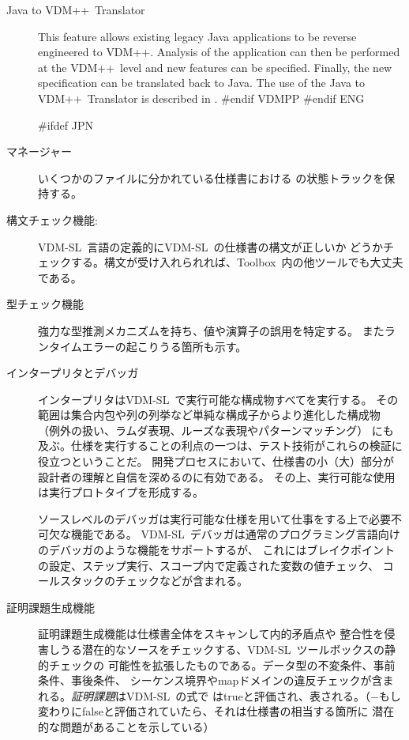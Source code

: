 \documentclass[\pformat,12pt]{article}
\def\vdmpp{{\small VDM}++}
\newcommand{\vdmslpp}{VDM-SL}
\newcommand{\Toolbox}{Toolbox}
\newcommand{\vdmslpp}{VDM++}
\newcommand{\Toolbox}{Toolbox}
\begin{document}
\begin{description}
\item[Java to \vdmpp\ Translator] This feature allows existing legacy Java
  applications to be reverse engineered to \vdmpp. Analysis of the
  application can then be performed at the \vdmpp\ level and new
  features can be specified. Finally, the new specification can be
  translated back to Java. The use of the Java to \vdmpp\ Translator
  is described in \cite{Java2VDMMan-CSK}.
#endif VDMPP
#endif ENG

#ifdef JPN
\item[マネージャー] いくつかのファイルに分かれている仕様書における
の状態トラックを保持する。

\item[構文チェック機能:] \vdmslpp\ 言語の定義的に\vdmslpp\ の仕様書の構文が正しいか
どうかチェックする。構文が受け入れられれば、\Toolbox\ 内の他ツールでも大丈夫である。

\item[型チェック機能]
  強力な型推測メカニズムを持ち、値や演算子の誤用を特定する。
またランタイムエラーの起こりうる箇所も示す。

\item[インタープリタとデバッガ] インタープリタは\vdmslpp\ で実行可能な構成物すべてを実行する。
その範囲は集合内包や列の列挙など単純な構成子からより進化した構成物
（例外の扱い、ラムダ表現、ルーズな表現やパターンマッチング）
にも及ぶ。仕様を実行することの利点の一つは、テスト技術がこれらの検証に役立つということだ。
開発プロセスにおいて、仕様書の小（大）部分が設計者の理解と自信を深めるのに有効である。
その上、実行可能な使用は実行プロトタイプを形成する。

ソースレベルのデバッガは実行可能な仕様を用いて仕事をする上で必要不可欠な機能である。
\vdmslpp\ デバッガは通常のプログラミング言語向けのデバッガのような機能をサポートするが、
これにはブレイクポイントの設定、ステップ実行、スコープ内で定義された変数の値チェック、
コールスタックのチェックなどが含まれる。

\item[証明課題生成機能] 証明課題生成機能は仕様書全体をスキャンして内的矛盾点や
整合性を侵害しうる潜在的なソースをチェックする、\vdmslpp\ ツールボックスの静的チェックの
可能性を拡張したものである。データ型の不変条件、事前条件、事後条件、
シーケンス境界やmapドメインの違反チェックが含まれる。\emph{証明課題}は\vdmslpp\ の式で
はtrueと評価され、表される。（−もし変わりにfalseと評価されていたら、それは仕様書の相当する箇所に
潜在的な問題があることを示している）


\end{description}
\end{document}
